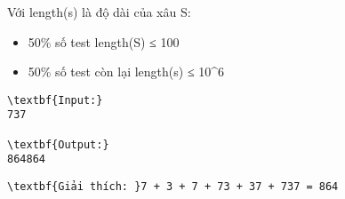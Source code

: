 Với length(s) là độ dài của xâu S:
\begin{itemize}
	\item 50\% số test length(S) ≤ 100
	\item 50\% số test còn lại length(s) ≤ 10^6
\end{itemize}
\begin{verbatim}
\textbf{Input:}
737

\textbf{Output:}
864864
\end{verbatim}
\begin{verbatim}
\textbf{Giải thích: }7 + 3 + 7 + 73 + 37 + 737 = 864
\end{verbatim}